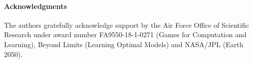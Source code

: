 \documentclass[11pt]{article}
\begin{document}
\paragraph{Acknowledgments}
The authors gratefully acknowledge support by  the Air Force Office of Scientific Research under award number FA9550-18-1-0271 (Games for Computation and Learning), Beyond Limits (Learning Optimal Models) and NASA/JPL (Earth 2050).





\end{document}
